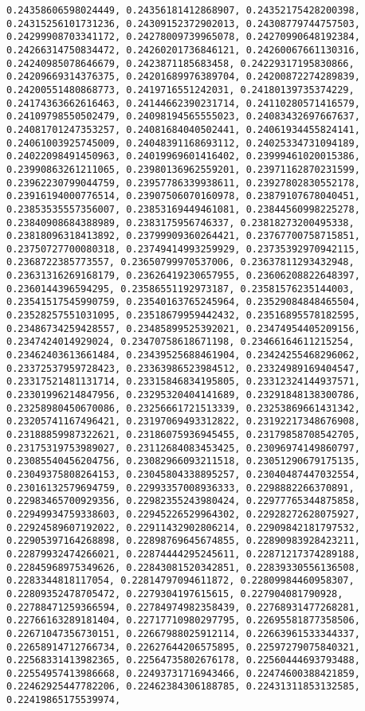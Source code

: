 \documentclass[11pt]{article}
\begin{document}
\begin{Verbatim}[commandchars=\\\{\}]
0.24358606598024449, 0.24356181412868907, 0.24352175428200398, 0.24315256101731236, 0.24309152372902013, 0.24308779744757503, 0.24299908703341172, 0.24278009739965078, 0.24270990648192384, 0.24266314750834472, 0.24260201736846121, 0.24260067661130316, 0.24240985078646679, 0.2423871185683458, 0.24229317195830866, 0.24209669314376375, 0.24201689976389704, 0.24200872274289839, 0.24200551480868773, 0.2419716551242031, 0.24180139735374229, 0.24174363662616463, 0.24144662390231714, 0.24110280571416579, 0.24109798550502479, 0.24098194565555023, 0.24083432697667637, 0.24081701247353257, 0.24081684040502441, 0.24061934455824141, 0.24061003925745009, 0.24048391168693112, 0.24025334731094189, 0.24022098491450963, 0.24019969601416402, 0.23999461020015386, 0.23990863261211065, 0.23980136962559201, 0.23971162870231599, 0.23962230799044759, 0.23957786339938611, 0.23927802830552178, 0.23916194000776514, 0.23907506070160978, 0.23879107678040451, 0.23853535557356007, 0.23853169449461081, 0.23844560998225278, 0.23840908684388989, 0.2383175956746337, 0.23818273200495338, 0.23818096318413892, 0.23799909360264421, 0.23767700758715851, 0.23750727700080318, 0.23749414993259929, 0.23735392970942115, 0.2368722385773557, 0.23650799970537006, 0.23637811293432948, 0.23631316269168179, 0.23626419230657955, 0.23606208822648397, 0.2360144396594295, 0.23586551192973187, 0.23581576235144003, 0.23541517545990759, 0.23540163765245964, 0.23529084848465504, 0.23528257551031095, 0.23518679959442432, 0.23516895578182595, 0.23486734259428557, 0.23485899525392021, 0.23474954405209156, 0.2347424014929024, 0.23470758618671198, 0.23466164611215254, 0.23462403613661484, 0.23439525688461904, 0.23424255468296062, 0.23372537959728423, 0.23363986523984512, 0.23324989169404547, 0.23317521481131714, 0.23315846834195805, 0.23312324144937571, 0.23301996214847956, 0.23295320404141689, 0.23291848138300786, 0.23258980450670086, 0.23256661721513339, 0.23253869661431342, 0.23205741167496421, 0.23197069493312822, 0.23192217348676908, 0.23188859987322621, 0.23186075936945455, 0.23179858708542705, 0.23175319753989027, 0.23112684083453425, 0.23096974149860797, 0.23085540456204756, 0.23082966093211518, 0.23051290679175135, 0.23049375808264153, 0.23045804338895257, 0.23040487447032554, 0.23016132579694759, 0.22993357008936333, 0.2298882266370891, 0.22983465700929356, 0.22982355243980424, 0.22977765344875858, 0.22949934759338603, 0.22945226529964302, 0.22928272628075927, 0.22924589607192022, 0.22911432902806214, 0.22909842181797532, 0.22905397164268898, 0.22898769645674855, 0.22890983928423211, 0.22879932474266021, 0.22874444295245611, 0.22871217374289188, 0.22845968975349626, 0.22843081520342851, 0.22839330556136508, 0.2283344818117054, 0.22814797094611872, 0.22809984460958307, 0.22809352478705472, 0.2279304197615615, 0.227904081790928, 0.22788471259366594, 0.22784974982358439, 0.22768931477268281, 0.22766163289181404, 0.22717710980297795, 0.22695581877358506, 0.22671047356730151, 0.22667988025912114, 0.22663961533344337, 0.22658914712766734, 0.22627644206575895, 0.22597279075840321, 0.22568331413982365, 0.22564735802676178, 0.22560444693793488, 0.22554957413986668, 0.22493731716943466, 0.22474600388421859, 0.22462925447782206, 0.22462384306188785, 0.22431311853132585, 0.22419865175539974, 
\end{Verbatim}
\end{document}
